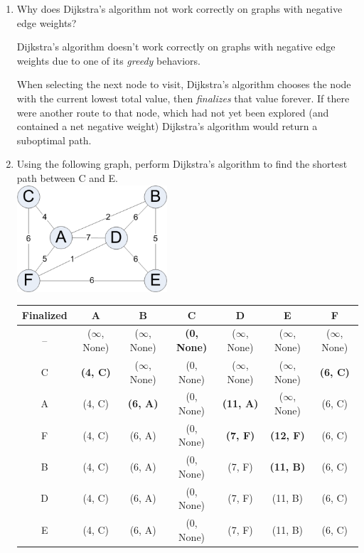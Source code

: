 \documentclass[11pt]{article}
\newenvironment{answer}{\large\lstset{basicstyle=\tiny\ttfamily}\color{white} }{}
\newenvironment{answer}{\large\lstset{basicstyle=\large\ttfamily}\color{red} }{}
\newcommand{\answerrow}[1]{\hline \rowfont{\color{white}} #1}
\newcommand{\answerrow}[1]{\hline \rowfont{\color{red}} #1}
\begin{document}
\begin{enumerate}
\item Why does Dijkstra's algorithm not work correctly on graphs with negative
      edge weights?

\begin{answer}
Dijkstra's algorithm doesn't work correctly on graphs with negative edge
weights due to one of its {\em greedy} behaviors.

When selecting the next node to visit, Dijkstra's algorithm chooses the
node with the current lowest total value, then {\em finalizes} that value
forever. If there were another route to that node, which had not yet been
explored (and contained a net negative weight) Dijkstra's algorithm would
return a suboptimal path.
\end{answer}


\item
Using the following graph, perform Dijkstra's algorithm to find the shortest path between C and E. \\
\includegraphics[height=150px]{graph} \\
\def\arraystretch{1.65}
\begin{tabu}{| c | c | c | c | c | c | c |}
\hline
Finalized & A & B & C & D & E & F\\
\hline
-- & ($\infty$, None) & ($\infty$, None) & \textbf{(0, None)} & ($\infty$, None) & ($\infty$, None) & ($\infty$, None) \\
\answerrow{C & \textbf{(4, C)} & ($\infty$, None) & (0, None) & ($\infty$, None) & ($\infty$, None) & \textbf{(6, C)}} \\
\answerrow{A & (4, C) & \textbf{(6, A)} & (0, None) & \textbf{(11, A)} & ($\infty$, None) & (6, C)} \\
\answerrow{F & (4, C) & (6, A) & (0, None) & \textbf{(7, F)} & \textbf{(12, F)} & (6, C)} \\
\answerrow{B & (4, C) & (6, A) & (0, None) & (7, F) & \textbf{(11, B)} & (6, C)} \\
\answerrow{D & (4, C) & (6, A) & (0, None) & (7, F) & (11, B) & (6, C)} \\
\answerrow{E & (4, C) & (6, A) & (0, None) & (7, F) & (11, B) & (6, C)} \\
\hline
\end{tabu}


\end{enumerate}
\end{document}
